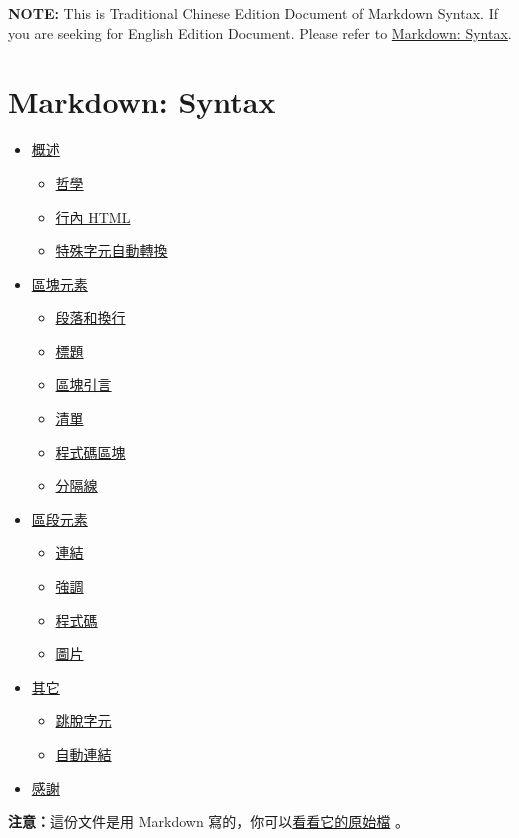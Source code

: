 \textbf{NOTE:} This is Traditional Chinese Edition Document of Markdown
Syntax. If you are seeking for English Edition Document. Please refer to
\href{http://daringfireball.net/projects/markdown/syntax}{Markdown:
Syntax}.

\section{Markdown: Syntax}

\begin{itemize}
\item
  \href{\#overview}{概述}
  \begin{itemize}
  \item
    \href{\#philosophy}{哲學}
  \item
    \href{\#html}{行內 HTML}
  \item
    \href{\#autoescape}{特殊字元自動轉換}
  \end{itemize}
\item
  \href{\#block}{區塊元素}
  \begin{itemize}
  \item
    \href{\#p}{段落和換行}
  \item
    \href{\#header}{標題}
  \item
    \href{\#blockquote}{區塊引言}
  \item
    \href{\#list}{清單}
  \item
    \href{\#precode}{程式碼區塊}
  \item
    \href{\#hr}{分隔線}
  \end{itemize}
\item
  \href{\#span}{區段元素}
  \begin{itemize}
  \item
    \href{\#link}{連結}
  \item
    \href{\#em}{強調}
  \item
    \href{\#code}{程式碼}
  \item
    \href{\#img}{圖片}
  \end{itemize}
\item
  \href{\#misc}{其它}
  \begin{itemize}
  \item
    \href{\#backslash}{跳脫字元}
  \item
    \href{\#autolink}{自動連結}
  \end{itemize}
\item
  \href{\#acknowledgement}{感謝}
\end{itemize}
\textbf{注意：}這份文件是用 Markdown
寫的，你可以\href{https://github.com/othree/markdown-syntax-zhtw/blob/master/syntax.md}{看看它的原始檔}
。


